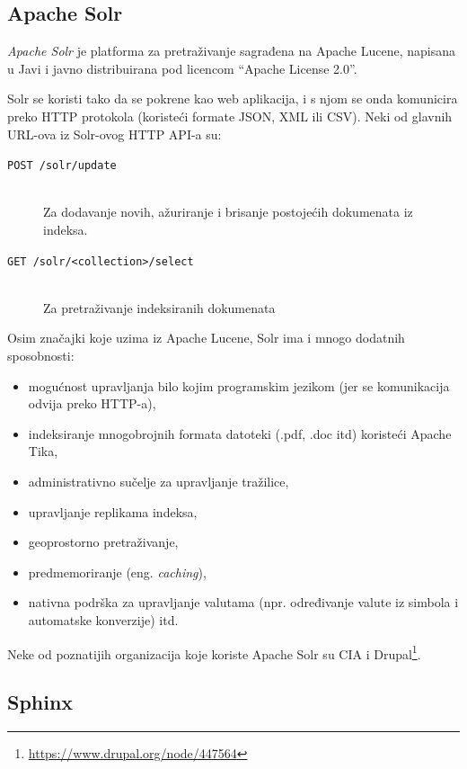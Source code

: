 \documentclass[a4paper,twoside,12pt]{scrreprt}
\begin{document}
\subsection{Apache Solr}

\textit{Apache Solr} je platforma za pretraživanje sagrađena na Apache Lucene, napisana u Javi i javno distribuirana pod licencom ``Apache License 2.0''.

Solr se koristi tako da se pokrene kao web aplikacija, i s njom se onda komunicira preko HTTP protokola (koristeći formate JSON, XML ili CSV). Neki od glavnih URL-ova iz Solr-ovog HTTP API-a su:

\begin{description}
  \item[\texttt{POST /solr/update}] \hfill \\ Za dodavanje novih, ažuriranje i brisanje postojećih dokumenata iz indeksa.
  \item[\texttt{GET /solr/<collection>/select}] \hfill \\ Za pretraživanje indeksiranih dokumenata
\end{description}

Osim značajki koje uzima iz Apache Lucene, Solr ima i mnogo dodatnih sposobnosti:

\begin{itemize}
  \item mogućnost upravljanja bilo kojim programskim jezikom (jer se komunikacija odvija preko HTTP-a),
  \item indeksiranje mnogobrojnih formata datoteki (.pdf, .doc itd) koristeći Apache Tika,
  \item administrativno sučelje za upravljanje tražilice,
  \item upravljanje replikama indeksa,
  \item geoprostorno pretraživanje,
  \item predmemoriranje (eng. \textit{caching}),
  \item nativna podrška za upravljanje valutama (npr. određivanje valute iz simbola i automatske konverzije) itd.
\end{itemize}

Neke od poznatijih organizacija koje koriste Apache Solr su CIA i Drupal\footnote{\url{https://www.drupal.org/node/447564}}.

\subsection{Sphinx}
\end{document}
